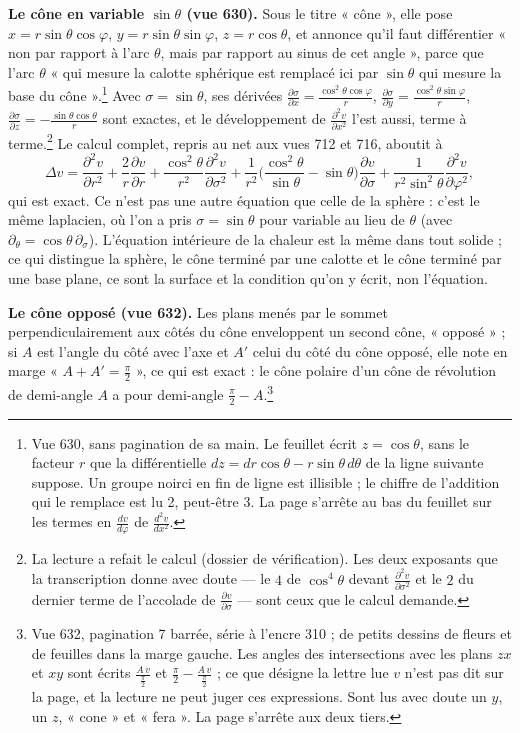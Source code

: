 \documentclass[11pt,a4paper]{article}
\begin{document}
\textbf{Le cône en variable $\sin\theta$ (vue 630).} Sous le titre « cône »,
elle pose $x = r\sin\theta\cos\varphi$, $y = r\sin\theta\sin\varphi$, $z =
r\cos\theta$, et annonce qu'il faut différentier « non par rapport à l'arc
$\theta$, mais par rapport au sinus de cet angle », parce que l'arc $\theta$
« qui mesure la calotte sphérique est remplacé ici par $\sin\theta$ qui mesure
la base du cône ».\footnote{Vue 630, sans pagination de sa main. Le feuillet
écrit $z = \cos\theta$, sans le facteur $r$ que la différentielle $dz = dr\cos
\theta - r\sin\theta\,d\theta$ de la ligne suivante suppose. Un groupe noirci
en fin de ligne est illisible ; le chiffre de l'addition qui le remplace est lu
2, peut-être 3. La page s'arrête au bas du feuillet sur les termes en
$\frac{dv}{d\varphi}$ de $\frac{d^2v}{dx^2}$.} Avec $\sigma = \sin\theta$, ses
dérivées $\frac{\partial\sigma}{\partial x} = \frac{\cos^2\theta\cos\varphi}{r}$,
$\frac{\partial\sigma}{\partial y} = \frac{\cos^2\theta\sin\varphi}{r}$,
$\frac{\partial\sigma}{\partial z} = -\frac{\sin\theta\cos\theta}{r}$ sont
exactes, et le développement de $\frac{\partial^2 v}{\partial x^2}$ l'est
aussi, terme à terme.\footnote{La lecture a refait le calcul (dossier de
vérification). Les deux exposants que la transcription donne avec doute — le
$4$ de $\cos^4\theta$ devant $\frac{\partial^2 v}{\partial\sigma^2}$ et le $2$
du dernier terme de l'accolade de $\frac{\partial v}{\partial\sigma}$ — sont
ceux que le calcul demande.} Le calcul complet, repris au net aux vues 712 et
716, aboutit à
\[
\Delta v = \frac{\partial^2 v}{\partial r^2} + \frac2r\frac{\partial v}{\partial r}
+ \frac{\cos^2\theta}{r^2}\frac{\partial^2 v}{\partial\sigma^2}
+ \frac{1}{r^2}\Big(\frac{\cos^2\theta}{\sin\theta} - \sin\theta\Big)
\frac{\partial v}{\partial\sigma}
+ \frac{1}{r^2\sin^2\theta}\frac{\partial^2 v}{\partial\varphi^2},
\]
qui est exact. Ce n'est pas une autre équation que celle de la sphère : c'est
le même laplacien, où l'on a pris $\sigma = \sin\theta$ pour variable au lieu
de $\theta$ (avec $\partial_\theta = \cos\theta\,\partial_\sigma$). L'équation
intérieure de la chaleur est la même dans tout solide ; ce qui distingue la
sphère, le cône terminé par une calotte et le cône terminé par une base plane,
ce sont la surface et la condition qu'on y écrit, non l'équation.

\textbf{Le cône opposé (vue 632).} Les plans menés par le sommet
perpendiculairement aux côtés du cône enveloppent un second cône, « opposé » ;
si $A$ est l'angle du côté avec l'axe et $A'$ celui du côté du cône opposé,
elle note en marge « $A + A' = \frac\pi2$ », ce qui est exact : le cône polaire
d'un cône de révolution de demi-angle $A$ a pour demi-angle $\frac\pi2 -
A$.\footnote{Vue 632, pagination 7 barrée, série à l'encre 310 ; de petits
dessins de fleurs et de feuilles dans la marge gauche. Les angles des
intersections avec les plans $zx$ et $xy$ sont écrits
$\frac{A\,v}{\frac{\pi}{2}}$ et $\frac\pi2 - \frac{A\,v}{\frac\pi2}$ ; ce que
désigne la lettre lue $v$ n'est pas dit sur la page, et la lecture ne peut
juger ces expressions. Sont lus avec doute un $y$, un $z$, « cone » et
« fera ». La page s'arrête aux deux tiers.}
\end{document}
